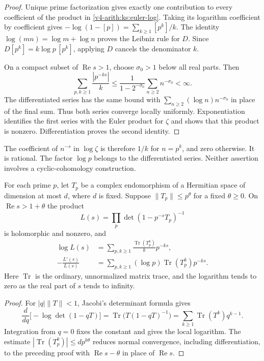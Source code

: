 \begin{proof}
Unique prime factorization gives exactly one contribution to every
coefficient of the product in \eqref{v4-arith:ks:euler-log}.
Taking its logarithm coefficient by coefficient gives
$-\log(1-[p])=\sum_{k\geq1}[p^k]/k$.
The identity $\log(mn)=\log m+\log n$ proves the Leibniz rule for $D$.
Since $D[p^k]=k\log p\,[p^k]$, applying $D$ cancels the denominator $k$.

On a compact subset of $\operatorname{Re}s>1$, choose $\sigma_0>1$
below all real parts. Then
\[
 \sum_{p,k\geq1}\frac{|p^{-ks}|}{k}
 \leq\frac{1}{1-2^{-\sigma_0}}\sum_{n\geq2}n^{-\sigma_0}<\infty.
\]
The differentiated series has the same bound with
$\sum_{n\geq2}(\log n)n^{-\sigma_0}$ in place of the final sum.
Thus both series converge locally uniformly. Exponentiation identifies
the first series with the Euler product for $\zeta$ and shows that this
product is nonzero. Differentiation proves the second identity.
\end{proof}

The coefficient of $n^{-s}$ in $\log\zeta$ is therefore $1/k$ for
$n=p^k$, and zero otherwise. It is rational. The factor $\log p$
belongs to the differentiated series. Neither assertion involves a
cyclic-cohomology construction.

\begin{proposition}
\label{v4-arith:ks:local-determinant-traces}
\ClaimStatusProvedHere{}
For each prime $p$, let $T_p$ be a complex endomorphism of a Hermitian
space of dimension at most $d$, where $d$ is fixed. Suppose
$\|T_p\|\leq p^\theta$ for a fixed $\theta\geq0$. On
$\operatorname{Re}s>1+\theta$ the product
\[
 L(s)=\prod_p\det(1-p^{-s}T_p)^{-1}
\]
is holomorphic and nonzero, and
\begin{align}
 \log L(s)&=\sum_{p,k\geq1}
      \frac{\operatorname{Tr}(T_p^k)}{k}p^{-ks},
      \label{v4-arith:ks:matrix-euler-log}\\
 -\frac{L'(s)}{L(s)}&=\sum_{p,k\geq1}
      (\log p)\operatorname{Tr}(T_p^k)p^{-ks}.
      \label{v4-arith:ks:matrix-euler-derivative}
\end{align}
Here $\operatorname{Tr}$ is the ordinary, unnormalized matrix trace,
and the logarithm tends to zero as the real part of $s$ tends to infinity.
\end{proposition}

\begin{proof}
For $|q|\|T\|<1$, Jacobi's determinant formula gives
\[
 \frac{d}{dq}\bigl[-\log\det(1-qT)\bigr]
   =\operatorname{Tr}\bigl(T(1-qT)^{-1}\bigr)
   =\sum_{k\geq1}\operatorname{Tr}(T^k)q^{k-1}.
\]
Integration from $q=0$ fixes the constant and gives the local logarithm.
The estimate $|\operatorname{Tr}(T_p^k)|\leq d p^{k\theta}$ reduces
normal convergence, including differentiation, to the preceding proof
with $\operatorname{Re}s-\theta$ in place of $\operatorname{Re}s$.
\end{proof}

